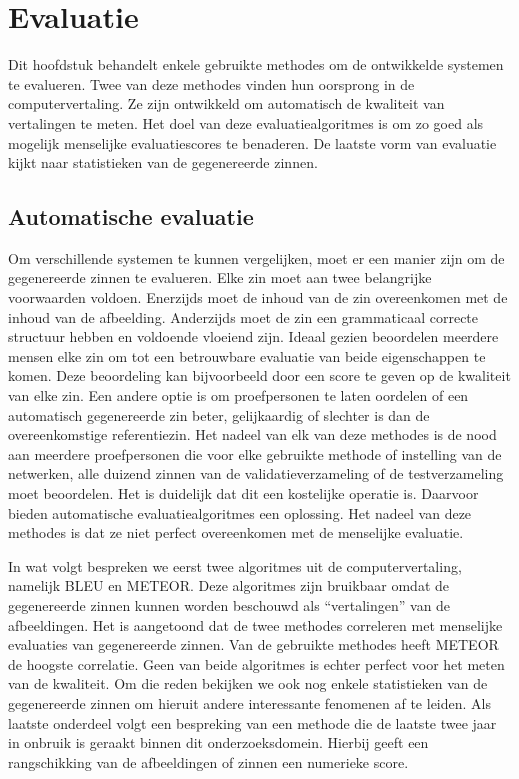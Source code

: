 \chapter{Evaluatie}
\label{hoofdstuk:evaluatie}
Dit hoofdstuk behandelt enkele gebruikte methodes om de ontwikkelde systemen te evalueren. Twee van deze methodes vinden hun oorsprong in de computervertaling. Ze zijn ontwikkeld om automatisch de kwaliteit van vertalingen te meten. Het doel van deze evaluatiealgoritmes is om zo goed als mogelijk menselijke evaluatiescores te benaderen. De laatste vorm van evaluatie kijkt naar statistieken van de gegenereerde zinnen.


\section{Automatische evaluatie}
Om verschillende systemen te kunnen vergelijken, moet er een manier zijn om de gegenereerde zinnen te evalueren. Elke zin moet aan twee belangrijke voorwaarden voldoen. Enerzijds moet de inhoud van de zin overeenkomen met de inhoud van de afbeelding. Anderzijds moet de zin een grammaticaal correcte structuur hebben en voldoende vloeiend zijn.
Ideaal gezien beoordelen meerdere mensen elke zin om tot een betrouwbare evaluatie van beide eigenschappen te komen. Deze beoordeling kan bijvoorbeeld door een score te geven op de kwaliteit van elke zin. Een andere optie is om proefpersonen te laten oordelen of een automatisch gegenereerde zin beter, gelijkaardig of slechter is dan de overeenkomstige referentiezin. Het nadeel van elk van deze methodes is de nood aan meerdere proefpersonen die voor elke gebruikte methode of instelling van de netwerken, alle duizend zinnen van de validatieverzameling of de testverzameling moet beoordelen. Het is duidelijk dat dit een kostelijke operatie is. Daarvoor bieden automatische evaluatiealgoritmes een oplossing. Het nadeel van deze methodes is dat ze niet perfect overeenkomen met de menselijke evaluatie.

In wat volgt bespreken we eerst twee algoritmes uit de computervertaling, namelijk BLEU en METEOR.  Deze algoritmes zijn bruikbaar omdat de gegenereerde zinnen kunnen worden beschouwd als ``vertalingen'' van de afbeeldingen. Het is aangetoond dat de twee methodes correleren met menselijke evaluaties van gegenereerde zinnen. Van de gebruikte methodes heeft METEOR de hoogste correlatie. 
Geen van beide algoritmes is echter perfect voor het meten van de kwaliteit.
Om die reden bekijken we ook nog enkele statistieken van de gegenereerde zinnen om hieruit andere interessante fenomenen af te leiden.
Als laatste onderdeel volgt een bespreking van een methode die de laatste twee jaar in onbruik is geraakt binnen dit onderzoeksdomein. Hierbij geeft een rangschikking van de afbeeldingen of zinnen een numerieke score.


